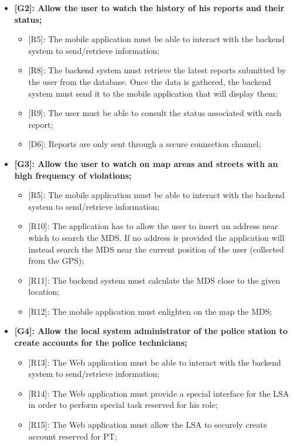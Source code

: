 \begin{itemize}
\begin{itemize}
    \end{itemize}
  \item \textbf{{[G2]}: Allow the user to watch the history of his reports and their status;}
    \begin{itemize}
      \item {[R5]}: The mobile application must be able to interact with the backend system to send/retrieve information;
      \item {[R8]}: The backend system must retrieve the latest reports submitted by the user from the database. Once the data is gathered, the backend system must send it to the mobile application that will display them;
      \item {[R9]}: The user must be able to consult the status associated with each report;
      \item {[D6]}: Reports are only sent through a secure connection channel;
    \end{itemize}
  \item \textbf{{[G3]}: Allow the user to watch on map areas and streets with an high frequency of violations;}
    \begin{itemize}
      \item {[R5]}: The mobile application must be able to interact with the backend system to send/retrieve information;
      \item {[R10]}: The application has to allow the user to insert an address near which to search the MDS. If no address is provided the application will instead search the MDS near the current position of the user (collected from the GPS);
      \item {[R11]}: The backend system must calculate the MDS close to the given location;
      \item {[R12]}: The mobile application must enlighten on the map the MDS;
    \end{itemize}
  \item \textbf{{[G4]}: Allow the local system administrator of the police station to create accounts for the police technicians;}
    \begin{itemize}
      \item {[R13]}: The Web application must be able to interact with the backend system to send/retrieve information;
      \item {[R14]}: The Web application must provide a special interface for the LSA in order to perform special task reserved for his role;
      \item {[R15]}: The Web application must allow the LSA to securely create account reserved for PT;

\end{itemize}
\end{itemize}
